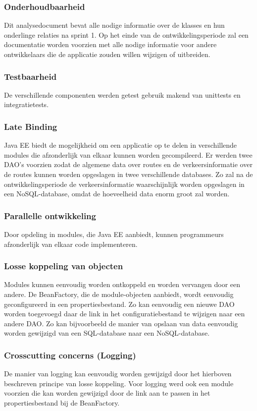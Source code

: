 \documentclass[ps,a4paper,oneside]{report}
\begin{document}
\subsubsection{Onderhoudbaarheid}
Dit analysedocument bevat alle nodige informatie over de klasses en hun onderlinge relaties na sprint 1. Op het einde van de ontwikkelingsperiode zal een documentatie worden voorzien met alle nodige informatie voor andere ontwikkelaars die de applicatie zouden willen wijzigen of uitbreiden.
\subsubsection{Testbaarheid}
De verschillende componenten werden getest gebruik makend van unittests en integratietests.
\subsubsection{Late Binding}
Java EE biedt de mogelijkheid om een applicatie op te delen in verschillende modules die afzonderlijk van elkaar kunnen worden gecompileerd. Er werden twee DAO’s voorzien zodat de algemene data over routes en de verkeersinformatie over de routes kunnen worden opgeslagen in twee verschillende databases. Zo zal na de ontwikkelingsperiode de verkeersinformatie waarschijnlijk worden opgeslagen in een NoSQL-database, omdat de hoeveelheid data enorm groot zal worden. 
\subsubsection{Parallelle ontwikkeling}
Door opdeling in modules, die Java EE aanbiedt, kunnen programmeurs afzonderlijk van elkaar code implementeren.
\subsubsection{Losse koppeling van objecten}
Modules kunnen eenvoudig worden ontkoppeld en worden vervangen door een andere. De BeanFactory, die de module-objecten aanbiedt, wordt eenvoudig geconfigureerd in een propertiesbestand. Zo kan eenvoudig een nieuwe DAO worden toegevoegd daar de link in het configuratiebestand te wijzigen naar een andere DAO. Zo kan bijvoorbeeld de manier van opslaan van data eenvoudig worden gewijzigd van een SQL-database naar een NoSQL-database.
\subsubsection{Crosscutting concerns (Logging)}
De manier van logging kan eenvoudig worden gewijzigd door het hierboven beschreven principe van losse koppeling. Voor logging werd ook een module voorzien die kan worden gewijzigd door de link aan te passen in het propertiesbestand bij de BeanFactory.
\end{document}
